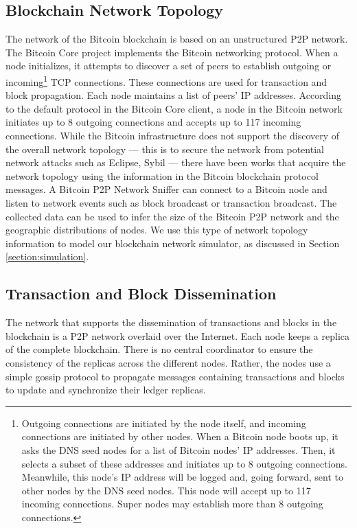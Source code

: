 \documentclass[10pt,journal,compsoc]{IEEEtran}
\begin{document}
\subsection{Blockchain Network Topology}
The network of the Bitcoin blockchain is based on an unstructured P2P network. The Bitcoin Core project \cite{bitcoincore} implements the Bitcoin networking protocol. When a node initializes, it attempts to discover a set of peers to establish outgoing or incoming\footnote{Outgoing connections are initiated by the node itself, and incoming connections are initiated by other nodes. When a Bitcoin node boots up, it asks the DNS seed nodes for a list of Bitcoin nodes’ IP addresses. Then, it selects a subset of these addresses and initiates up to 8 outgoing connections. Meanwhile, this node’s IP address will be logged and, going forward, sent to other nodes by the DNS seed nodes. This node will accept up to 117 incoming connections. Super nodes may establish more than 8 outgoing connections.} TCP connections. These connections are used for transaction and block propagation. Each node maintains a list of peers' IP addresses. According to the default protocol in the Bitcoin Core client, a node in the Bitcoin network initiates up to 8 outgoing connections and accepts up to 117 incoming connections. While the Bitcoin infrastructure does not support the discovery of the overall network topology — this is to secure the network from potential network attacks such as Eclipse\cite{heilman2015eclipse}, Sybil\cite{bissias2014sybil} — there have been works that acquire the network topology using the information in the Bitcoin blockchain protocol messages. A Bitcoin P2P Network Sniffer\cite{donet2014bitcoin} can connect to a Bitcoin node and listen to network events such as block broadcast or transaction broadcast. The collected data can be used to infer the size of the Bitcoin P2P network and the geographic distributions of nodes. We use this type of network topology information to model our blockchain network simulator, as discussed in Section \ref{section:simulation}.

\subsection{Transaction and Block Dissemination}
The network that supports the dissemination of transactions and blocks in the blockchain is a P2P network overlaid over the Internet. Each node keeps a replica of the complete blockchain. There is no central coordinator to ensure the consistency of the replicas across the different nodes. Rather, the nodes use a simple gossip protocol to propagate messages containing transactions and blocks to update and synchronize their ledger replicas. 
\end{document}
